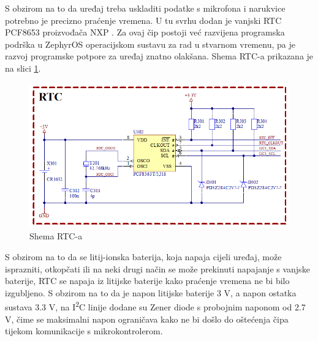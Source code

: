 S obzirom na to da uređaj treba uskladiti podatke s mikrofona i narukvice potrebno je precizno praćenje vremena. U tu svrhu dodan je vanjski RTC PCF8653 proizvođača NXP \cite{nxp:pcf8654}. Za ovaj čip postoji već razvijena programska podrška u ZephyrOS operacijskom sustavu za rad u stvarnom vremenu, pa je razvoj programske potpore za uređaj znatno olakšana. Shema RTC-a prikazana je na slici \ref{slk:RTC}.
\begin{figure}[hbt]
    \centering
    \includegraphics[width=\textwidth]{Figures/RTC.png}
    \caption{Shema RTC-a}
    \label{slk:RTC}
\end{figure}
S obzirom na to da se litij-ionska baterija, koja napaja cijeli uređaj, može isprazniti, otkopčati ili na neki drugi način se može prekinuti napajanje s vanjske baterije, RTC se napaja iz litijske baterije kako praćenje vremena ne bi bilo izgubljeno. S obzirom na to da je napon litijske baterije 3 V, a napon ostatka sustava 3.3 V, na I\textsuperscript{2}C linije dodane su Zener diode s probojnim naponom od 2.7 V, čime se maksimalni napon ograničava kako ne bi došlo do oštećenja čipa tijekom komunikacije s mikrokontrolerom.

